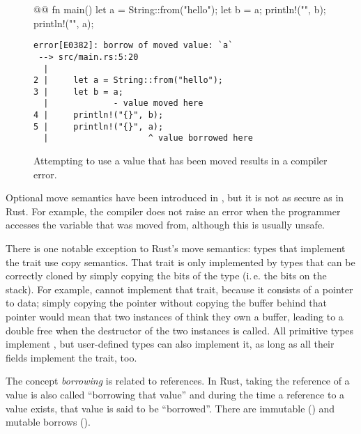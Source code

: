 {{\begin{figure}[b]
  \centering
  \begin{minipage}[t]{.5\textwidth}
    \begin{rustcode}
      @@
      fn main() {
          let a = String::from("hello");
          let b = a;
          println!("{}", b);
          println!("{}", a);
      }
    \end{rustcode}
  \end{minipage}
  \hspace{2mm}
  \begin{minipage}[t]{.47\textwidth}
    \footnotesize
    \vspace{3mm}
    \begin{verbatim}
error[E0382]: borrow of moved value: `a`
 --> src/main.rs:5:20
  |
2 |     let a = String::from("hello");
3 |     let b = a;
  |             - value moved here
4 |     println!("{}", b);
5 |     println!("{}", a);
  |                    ^ value borrowed here
    \end{verbatim}
  \end{minipage}
  \caption{Attempting to use a value that has been moved results in a compiler error.}
  \label{fig:string-move}
\end{figure}

Optional move semantics have been introduced in \cppeleven, but it is not as secure as in Rust.
For example, the \cpp compiler does not raise an error when the programmer accesses the variable that was moved from, although this is usually unsafe.

There is one notable exception to Rust's move semantics: types that implement the trait  use copy semantics.
That trait is only implemented by types that can be correctly cloned by simply copying the bits of the type (i.\,e. the bits on the stack).
For example,  cannot implement that trait, because it consists of a pointer to data; simply copying the pointer without copying the buffer behind that pointer would mean that two instances of  think they own a buffer, leading to a double free when the destructor of the two instances is called.
All primitive types implement , but user-defined types can also implement it, as long as all their fields implement the trait, too.

\vspace{8mm}

The concept \emph{borrowing} is related to references.
In Rust, taking the reference of a value is also called \enquote{borrowing that value} and during the time a reference to a value exists, that value is said to be \enquote{borrowed}.
There are immutable () and mutable borrows ().

}}
